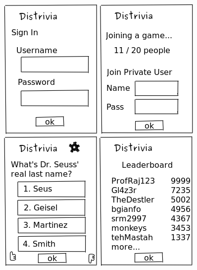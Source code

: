 \documentclass{dependencies/acm_proc_article-sp}
\begin{document}
  \includegraphics[scale=0.3]{design-pictures/login.png}
  \includegraphics[scale=0.3]{design-pictures/joingame.png}
  \includegraphics[scale=0.3]{design-pictures/quiz.png}
  \includegraphics[scale=0.3]{design-pictures/leaderboard.png}
\end{document}
